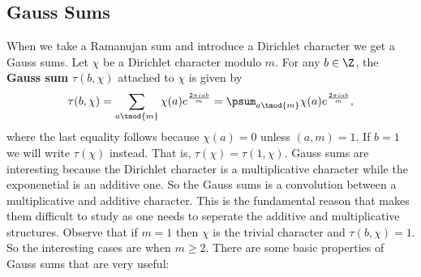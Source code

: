       \subsection*{Gauss Sums}
        When we take a Ramanujan sum and introduce a Dirichlet character we get a Gauss sums. Let $\chi$ be a Dirichlet character modulo $m$. For any $b \in \Z$, the \textbf{Gauss sum} $\tau(b,\chi)$ attached to $\chi$ is given by
        \[
          \tau(b,\chi) = \sum_{a \tmod{m}}\chi(a)e^{\frac{2\pi iab}{m}} = \psum_{a \tmod{m}}\chi(a)e^{\frac{2\pi iab}{m}},
        \]
        where the last equality follows because $\chi(a) = 0$ unless $(a,m) = 1$. If $b = 1$ we will write $\tau(\chi)$ instead. That is, $\tau(\chi) = \tau(1,\chi)$. Gauss sums are interesting because the Dirichlet character is a multiplicative character while the exponenetial is an additive one. So the Gauss sums is a convolution between a multiplicative and additive character. This is the fundamental reason that makes them difficult to study as one needs to seperate the additive and multiplicative structures. Observe that if $m = 1$ then $\chi$ is the trivial character and $\tau(b,\chi) = 1$. So the interesting cases are when $m \ge 2$. There are some basic properties of Gauss sums that are very useful:

